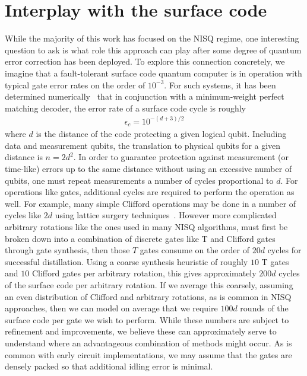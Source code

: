 \documentclass[
amsmath,
amssymb,
aps,
pra,
reprint,
twocolumn,
superscriptaddress,
longbibliography,
showkeys,
floatfix
]{revtex4-1}
\begin{document}
\section{Interplay with the surface code}\label{app:surface_code}
While the majority of this work has focused on the NISQ regime, one interesting
question to ask is what role this approach can play after some degree of quantum
error correction has been deployed. 
To explore this connection concretely, we imagine that a fault-tolerant surface
code quantum computer is in operation with typical gate error rates on the order
of $10^{-3}$. 
For such systems, it has been determined numerically~\cite{Wang2010-wq} that in conjunction with a
minimum-weight perfect matching decoder, the error rate of a surface code cycle
is roughly
\begin{align}
  \epsilon_c = 10^{-(d+3)/2}
\end{align}
where $d$ is the distance of the code protecting a given logical qubit. 
Including data and measurement qubits, the translation to physical qubits for a
given distance is $n = 2d^2$. 
In order to guarantee protection against measurement (or time-like) errors up to
the same distance without using an excessive number of qubits, one must repeat
measurements a number of cycles proportional to $d$. 
For operations like gates, additional cycles are required to perform the
operation as well. 
For example, many simple Clifford operations may be done in a number of cycles
like $2d$ using lattice surgery techniques~\cite{Horsman2012-vd,Litinski2019-dg}. 
However more complicated arbitrary rotations like the ones used in many NISQ
algorithms, must first be broken down into a combination of discrete gates like
T and Clifford gates through gate synthesis, then those $T$ gates consume on the
order of $20d$ cycles for successful distillation. 
Using a coarse synthesis heuristic of roughly $10$ T gates and $10$ Clifford
gates per arbitrary rotation, this gives approximately $200d$ cycles of the
surface code per arbitrary rotation.
If we average this coarsely, assuming an even distribution of Clifford and
arbitrary rotations, as is common in NISQ approaches, then we can model on
average that we require $100d$ rounds of the surface code per gate we wish to
perform.  While these numbers are subject to refinement and improvements, we believe
these can approximately serve to understand where an advantageous combination
of methods might occur.
As is common with early circuit implementations, we may assume that the gates
are densely packed so that additional idling error is minimal. 
\end{document}
